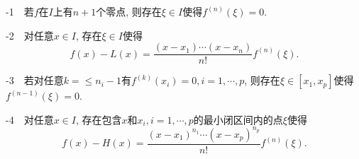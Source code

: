 -1~~若$f$在$I$上有$n+1$个零点, 则存在$\xi \in I$使得$f^{(n)}(\xi) = 0$. 
\vspace{1em}
\begin{exsolution}
	
\end{exsolution}

-2~~对任意$x \in I$, 存在$\xi \in I$使得$$f(x)-L(x) = \frac{(x-x_1)\cdots (x-x_n)}{n!}f^{(n)}(\xi). $$
\begin{exsolution}
	
\end{exsolution}

-3~~若对任意$k=\leq n_i-1$有$f^{(k)}(x_i)=0, i=1,\cdots ,p$, 则存在$\xi \in [x_1,x_p]$使得$f^{(n-1)}(\xi) = 0$. 
\begin{exsolution}
	
\end{exsolution}

-4~~对任意$x \in I$, 存在包含$x$和$x_i,i=1,\cdots ,p$的最小闭区间内的点$\xi$使得$$f(x) - H(x) = \frac{(x-x_1)^{n_1} \cdots (x-x_p)^{n_p}}{n!} f^{(n)}(\xi). $$
\begin{exsolution}
	
\end{exsolution}






















